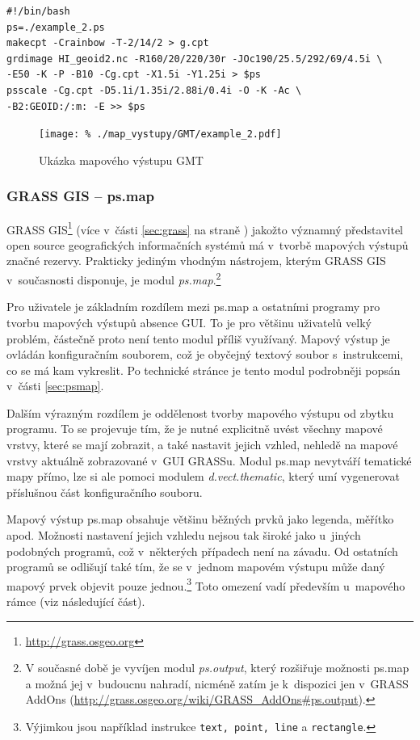 \documentclass[a4paper,12pt,draft]{article}
\newcommand{\modul}[1]{\emph{#1}}
\newcommand{\instr}[1]{\lstinline[style=psmapInline]|#1|}
\begin{document}
\begin{lstlisting}[style=script]
#!/bin/bash
ps=./example_2.ps
makecpt -Crainbow -T-2/14/2 > g.cpt
grdimage HI_geoid2.nc -R160/20/220/30r -JOc190/25.5/292/69/4.5i \
-E50 -K -P -B10 -Cg.cpt -X1.5i -Y1.25i > $ps
psscale -Cg.cpt -D5.1i/1.35i/2.88i/0.4i -O -K -Ac \
-B2:GEOID:/:m: -E >> $ps
\end{lstlisting}


\begin{figure}[h!]
\centering
\texttt{[image: \%
./map\_vystupy/GMT/example\_2.pdf]}
  \caption{Ukázka mapového výstupu GMT}
  \label{fig:gmt}
\end{figure}



\subsubsection{GRASS GIS -- ps.map}
\label{sec:porovnani:psmap}
GRASS GIS\footnote{\url{http://grass.osgeo.org}}
(více v~části \ref{sec:grass} na straně \pageref{sec:grass})
jakožto významný představitel open source geografických informačních
systémů má v~tvorbě mapových výstupů značné rezervy. Prakticky
jediným vhodným nástrojem, kterým GRASS GIS v~současnosti disponuje,
je modul \modul{ps.map}.\footnote{V současné době je vyvíjen modul
\modul{ps.output}, který rozšiřuje možnosti ps.map a možná
jej v~budoucnu nahradí, nicméně zatím je k~dispozici jen v~GRASS AddOns
(\url{http://grass.osgeo.org/wiki/GRASS_AddOns\#ps.output}).}

Pro uživatele je základním rozdílem mezi ps.map a ostatními
programy pro tvorbu mapových výstupů  absence GUI.
To je pro většinu uživatelů velký problém, částečně
proto není tento modul příliš využívaný. Mapový výstup je ovládán
konfiguračním souborem, což je obyčejný textový soubor s~instrukcemi,
co se má kam vykreslit. Po technické stránce je tento modul podrobněji
popsán v~části \ref{sec:psmap}.

Dalším výrazným rozdílem je oddělenost tvorby mapového výstupu od
zbytku programu. To se projevuje tím, že je nutné explicitně uvést
všechny mapové vrstvy, které se mají zobrazit, a také nastavit jejich
vzhled, nehledě na mapové vrstvy aktuálně zobrazované  v~GUI GRASSu.
Modul ps.map nevytváří
tematické mapy přímo, lze si ale pomoci modulem \emph{d.vect.thematic},
který umí vygenerovat příslušnou část konfiguračního souboru.



Mapový výstup ps.map obsahuje většinu běžných prvků jako
legenda, měřítko apod. Možnosti nastavení jejich vzhledu nejsou tak
široké jako u~jiných podobných programů, což v~některých případech není na
závadu.
Od ostatních programů se odlišují také tím, že se v~jednom mapovém výstupu může
daný mapový prvek objevit pouze jednou.\footnote{Výjimkou jsou například
instrukce \instr{text, point, line} a \instr{rectangle}.} Toto omezení 
vadí především u~mapového rámce (viz následující část).
\end{document}
